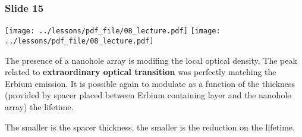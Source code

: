 \documentclass[../main/main.tex]{subfiles}
\begin{document}
\subsubsection*{Slide 15}

\begin{minipage}[]{0.5\linewidth}
\centering
\texttt{[image: ../lessons/pdf\_file/08\_lecture.pdf]}
\texttt{[image: ../lessons/pdf\_file/08\_lecture.pdf]}
\end{minipage}
\hspace{0.3cm}
\vspace{0.3cm}
\begin{minipage}[c]{0.47\linewidth}

The presence of a nanohole array is modifing the local optical density. The peak related to \textbf{extraordinary optical transition} was perfectly matching the Erbium emission. It is possible again to modulate as a function of the thickness (provided by spacer placed between Erbium containing layer and the nanohole array) the lifetime.

The smaller is the spacer thickness, the smaller is the reduction on the lifetime.

\end{minipage}
\end{document}
